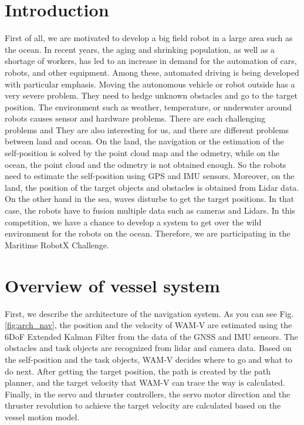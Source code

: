 \documentclass[lettersize,journal]{IEEEtran}
\begin{document}
\section{Introduction}
First of all, we are motivated to develop a big field robot in a large area such as the ocean.
In recent years, the aging and shrinking population, as well as a shortage of workers,
has led to an increase in demand for the automation of cars, robots, and other equipment.
Among these, automated driving is being developed with particular emphasis.
Moving the autonomous vehicle or robot outside has a very severe problem.
They need to hedge unknown obstacles and go to the target position.
The environment such as weather, temperature, or underwater around robots causes sensor and hardware problems.
There are each challenging problems and They are also interesting for us, and there are different problems between land and ocean.
On the land, the navigation or the estimation of the self-position is solved by the point cloud map and the odmetry,
while on the ocean, the point cloud and the odmetry is not obtained enough. So the robots need to estimate the self-position using GPS and IMU sensors.
Moreover, on the land, the position of the target objects and obstacles is obtained from Lidar data. On the other hand in the sea,
waves disturbe to get the target positions. In that case, the robots have to fusion multiple data such as cameras and Lidars.
In this competition, we have a chance to develop a system to get over the wild environment 
for the robots on the ocean. Therefore, we are participating in the Maritime RobotX Challenge.

\section{Overview of vessel system}
First, we describe the architecture of the navigation system. As you can see Fig. \ref{fig:arch_nav},
the position and the velocity of WAM-V are estimated using the 6DoF Extended Kalman Filter \cite{robotx_ekf}
from the data of the GNSS and IMU sensors.
The obstacles and task objects are recognized from lidar and camera data. Based on the self-position and the task objects, 
WAM-V decides where to go and what to do next.
After getting the target position, the path is created by the path planner,
and the target velocity that WAM-V can trace the way is calculated. 
Finally, in the servo and thruster controllers,
the servo motor direction and the thruster revolution to achieve the target velocity are calculated based on the vessel motion model.
\end{document}
